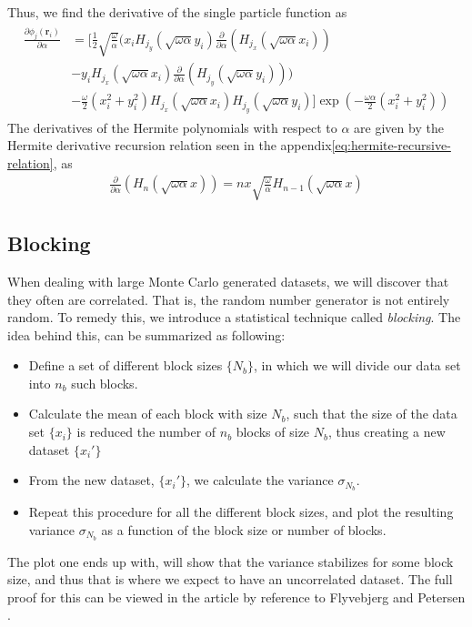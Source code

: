 \documentclass[11pt]{article}
\newcommand{\husk}[1]{\color{red} #1 \color{black}}
\begin{document}
Thus, we find the derivative of the single particle function as
\begin{align}
	\begin{split}
		\frac{\partial \phi_j(\mathbf{r}_i)}{\partial \alpha} &= \bigg[ \frac{1}{2}\sqrt{\frac{\omega}{\alpha}}\bigg( x_i H_{j_y} (\sqrt{\omega\alpha} y_i) \frac{\partial}{\partial \alpha}\left( H_{j_x} (\sqrt{\omega\alpha}x_i) \right) \\
		&- y_i H_{j_x} (\sqrt{\omega\alpha}x_i) \frac{\partial}{\partial \alpha}\left( H_{j_y} (\sqrt{\omega\alpha}y_i) \right)\bigg) \\
		&- \frac{\omega}{2}(x_i^2 + y_i^2) H_{j_x} (\sqrt{\omega\alpha}x_i) H_{j_y} (\sqrt{\omega\alpha} y_i) \bigg] \exp{\left(-\frac{\omega\alpha}{2}\left( x_i^2 + y_i^2 \right)\right)}
	\end{split}
	\label{eq:wf-sp-alpha-derivative}
\end{align}
The derivatives of the Hermite polynomials with respect to $\alpha$ are given by the Hermite derivative recursion relation seen in the appendix\eqref{eq:hermite-recursive-relation}, as
\begin{align}
	\frac{\partial}{\partial\alpha} \left(H_n(\sqrt{\omega\alpha}x)\right) = nx\sqrt{\frac{\omega}{\alpha}} H_{n-1}(\sqrt{\omega\alpha}x)
	\label{eq:hermite-alpha-derivative}
\end{align}

\subsection{Blocking}
When dealing with large Monte Carlo generated datasets, we will discover that they often are correlated. That is, the random number generator is not entirely random. To remedy this, we introduce a statistical technique called \textit{blocking}. The idea behind this, can be summarized as following:
\begin{itemize}
	\item Define a set of different block sizes $\{N_b\}$, in which we will divide our data set into $n_b$ such blocks.
	\item Calculate the mean of each block with size $N_b$, such that the size of the data set $\{x_i\}$ is reduced the number of $n_b$ blocks of size $N_b$, thus creating a new dataset $\{x_i'\}$
	\item From the new dataset, $\{x_i'\}$, we calculate the variance $\sigma_{N_b}$.
	\item Repeat this procedure for all the different block sizes, and plot the resulting variance $\sigma_{N_b}$ as a function of the block size or number of blocks.
\end{itemize}
The plot one ends up with, will show that the variance stabilizes for some block size, and thus that is where we expect to have an uncorrelated dataset. The full proof for this can be viewed in the article by\husk{reference to Flyvebjerg and Petersen}.
\end{document}
